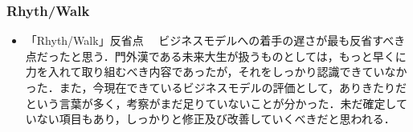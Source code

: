 \subsubsection{Rhyth/Walk}
\begin{itemize}
　Cool Japanimationと同様の期間で，同じく未来大のみで書類を作成した．場所を問わず何度も会議を重ね，もらったレビューに対してどうすべきかを班の皆で話し合い，完成へと扱ぎ付けた．収支予測など分からないことは昨年の例やネット文献，先輩の助言などを頼りに調べ，分からないなりにうまく仕上げることができた．しかし，こちらもCool Japanimation同様一次審査を通過することは叶わなかった．
\item「Rhyth/Walk」反省点
　ビジネスモデルへの着手の遅さが最も反省すべき点だったと思う．門外漢である未来大生が扱うものとしては，もっと早くに力を入れて取り組むべき内容であったが，それをしっかり認識できていなかった．また，今現在できているビジネスモデルの評価として，ありきたりだという言葉が多く，考察がまだ足りていないことが分かった．未だ確定していない項目もあり，しっかりと修正及び改善していくべきだと思われる．
\end{itemize}
